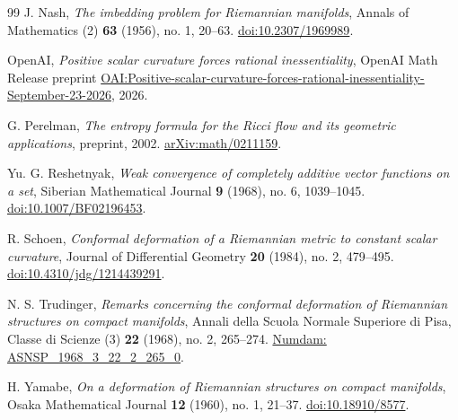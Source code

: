 \begin{thebibliography}{99}
J. Nash, \emph{The imbedding problem for Riemannian manifolds},
Annals of Mathematics (2) \textbf{63} (1956), no. 1, 20--63.
\href{https://doi.org/10.2307/1969989}{doi:10.2307/1969989}.

OpenAI, \emph{Positive scalar curvature forces rational inessentiality},
OpenAI Math Release preprint
\href{https://github.com/openai/math/blob/main/preprints/Positive-scalar-curvature-forces-rational-inessentiality-September-23-2026/paper.pdf}{OAI:Positive-scalar-curvature-forces-rational-inessentiality-September-23-2026},
2026.

G. Perelman, \emph{The entropy formula for the Ricci flow and its
geometric applications}, preprint, 2002.
\href{https://arxiv.org/abs/math/0211159}{arXiv:math/0211159}.

Yu. G. Reshetnyak, \emph{Weak convergence of completely additive vector
functions on a set}, Siberian Mathematical Journal \textbf{9} (1968),
no. 6, 1039--1045.
\href{https://doi.org/10.1007/BF02196453}{doi:10.1007/BF02196453}.

R. Schoen, \emph{Conformal deformation of a Riemannian metric to
constant scalar curvature}, Journal of Differential Geometry
\textbf{20} (1984), no. 2, 479--495.
\href{https://doi.org/10.4310/jdg/1214439291}
{doi:10.4310/jdg/1214439291}.

N. S. Trudinger, \emph{Remarks concerning the conformal deformation of
Riemannian structures on compact manifolds},
Annali della Scuola Normale Superiore di Pisa, Classe di Scienze (3)
\textbf{22} (1968), no. 2, 265--274.
\href{https://www.numdam.org/item/ASNSP_1968_3_22_2_265_0/}
{Numdam: ASNSP\_1968\_3\_22\_2\_265\_0}.

H. Yamabe, \emph{On a deformation of Riemannian structures on compact
manifolds}, Osaka Mathematical Journal \textbf{12} (1960), no. 1,
21--37.
\href{https://doi.org/10.18910/8577}{doi:10.18910/8577}.

\end{thebibliography}
